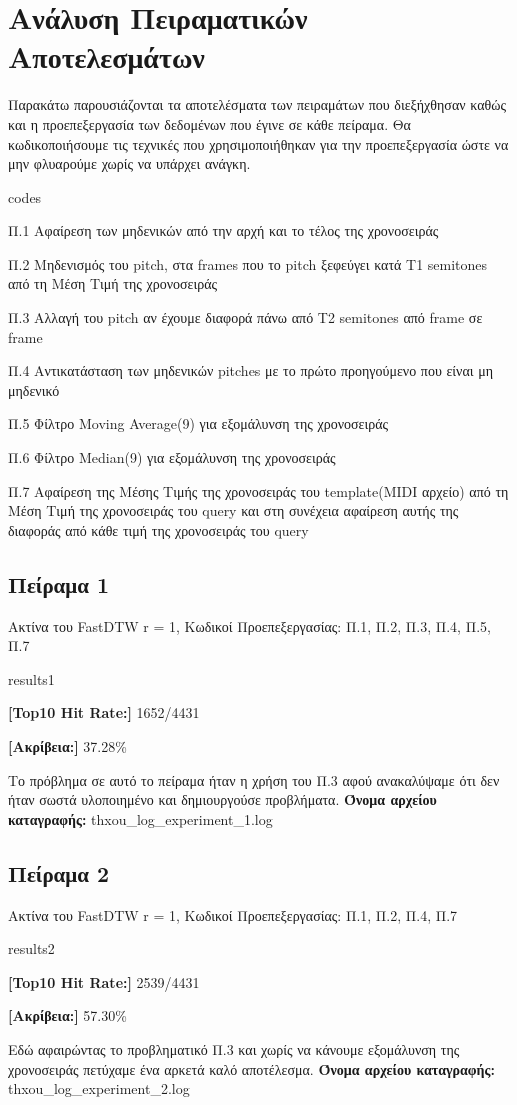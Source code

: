 \section{Ανάλυση Πειραματικών Αποτελεσμάτων}
Παρακάτω παρουσιάζονται τα αποτελέσματα των πειραμάτων που διεξήχθησαν καθώς και η προεπεξεργασία
των δεδομένων που έγινε σε κάθε πείραμα.
Θα κωδικοποιήσουμε τις τεχνικές που χρησιμοποιήθηκαν για την προεπεξεργασία ώστε να μην φλυαρούμε χωρίς
να υπάρχει ανάγκη.
\begin{labeling}{codes}
  \item[Π.1] Αφαίρεση των μηδενικών από την αρχή και το τέλος της χρονοσειράς
  \item[Π.2] Μηδενισμός του pitch, στα frames που το pitch ξεφεύγει κατά T1 semitones από τη Μέση Τιμή της χρονοσειράς
  \item[Π.3] Αλλαγή του pitch αν έχουμε διαφορά πάνω από Τ2 semitones από frame σε frame
  \item[Π.4] Αντικατάσταση των μηδενικών pitches με το πρώτο προηγούμενο που είναι μη μηδενικό
  \item[Π.5] Φίλτρο Moving Average(9) για εξομάλυνση της χρονοσειράς
  \item[Π.6] Φίλτρο Median(9) για εξομάλυνση της χρονοσειράς
  \item[Π.7] Αφαίρεση της Μέσης Τιμής της χρονοσειράς του template(MIDI αρχείο) από τη Μέση Τιμή της χρονοσειράς του query και στη συνέχεια αφαίρεση αυτής της διαφοράς από κάθε τιμή της χρονοσειράς του query 
\end{labeling}

\subsection{Πείραμα 1}
Ακτίνα του FastDTW r = 1, Κωδικοί Προεπεξεργασίας: Π.1, Π.2, Π.3, Π.4, Π.5, Π.7
\begin{labeling}{results1}
  \item \textbf{[Top10 Hit Rate:]} 1652/4431
  \item \textbf{[Ακρίβεια:]} 37.28\%
\end{labeling}
Το πρόβλημα σε αυτό το πείραμα ήταν η χρήση του Π.3 αφού ανακαλύψαμε ότι δεν ήταν σωστά υλοποιημένο και δημιουργούσε προβλήματα.
\textbf{Όνομα αρχείου καταγραφής:} thxou\_log\_experiment\_1.log

\subsection{Πείραμα 2}
Ακτίνα του FastDTW r = 1, Κωδικοί Προεπεξεργασίας: Π.1, Π.2, Π.4, Π.7
\begin{labeling}{results2}
  \item \textbf{[Top10 Hit Rate:]} 2539/4431
  \item \textbf{[Ακρίβεια:]} 57.30\%
\end{labeling}
Εδώ αφαιρώντας το προβληματικό Π.3 και χωρίς να κάνουμε εξομάλυνση της χρονοσειράς πετύχαμε ένα αρκετά καλό αποτέλεσμα.
\textbf{Όνομα αρχείου καταγραφής:} thxou\_log\_experiment\_2.log

